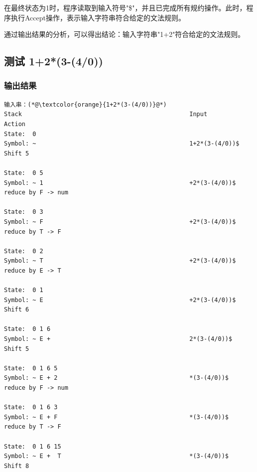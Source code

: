 \documentclass[lang=cn,11pt,a4paper]{elegantpaper}
\begin{document}
在最终状态为1时，程序读取到输入符号"\$"，并且已完成所有规约操作。此时，程序执行Accept操作，表示输入字符串符合给定的文法规则。

通过输出结果的分析，可以得出结论：输入字符串"1+2"符合给定的文法规则。

\subsection{测试 1+2*(3-(4/0))}

\subsubsection{输出结果}

\begin{lstlisting}[language=text]
输入串：(*@\textcolor{orange}{1+2*(3-(4/0))}@*)
Stack                                              	Input                          	Action
State:  0                                         
Symbol: ~                                          	1+2*(3-(4/0))$                	Shift 5

State:  0 5                                       
Symbol: ~ 1                                        	+2*(3-(4/0))$                 	reduce by F -> num

State:  0 3                                       
Symbol: ~ F                                        	+2*(3-(4/0))$                 	reduce by T -> F

State:  0 2                                       
Symbol: ~ T                                        	+2*(3-(4/0))$                 	reduce by E -> T

State:  0 1                                       
Symbol: ~ E                                        	+2*(3-(4/0))$                 	Shift 6

State:  0 1 6                                     
Symbol: ~ E +                                      	2*(3-(4/0))$                  	Shift 5

State:  0 1 6 5                                   
Symbol: ~ E + 2                                    	*(3-(4/0))$                   	reduce by F -> num

State:  0 1 6 3                                   
Symbol: ~ E + F                                    	*(3-(4/0))$                   	reduce by T -> F

State:  0 1 6 15                                  
Symbol: ~ E +  T                                   	*(3-(4/0))$                   	Shift 8


\end{lstlisting}
\end{document}
